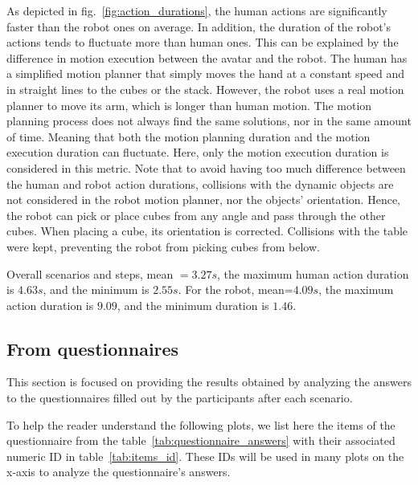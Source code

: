 As depicted in fig.~\ref{fig:action_durations}, the human actions are significantly faster than the robot ones on average. In addition, the duration of the robot's actions tends to fluctuate more than human ones. This can be explained by the difference in motion execution between the avatar and the robot. The human has a simplified motion planner that simply moves the hand at a constant speed and in straight lines to the cubes or the stack. However, the robot uses a real motion planner to move its arm, which is longer than human motion. The motion planning process does not always find the same solutions, nor in the same amount of time. Meaning that both the motion planning duration and the motion execution duration can fluctuate. Here, only the motion execution duration is considered in this metric. Note that to avoid having too much difference between the human and robot action durations, collisions with the dynamic objects are not considered in the robot motion planner, nor the objects' orientation. Hence, the robot can pick or place cubes from any angle and pass through the other cubes. When placing a cube, its orientation is corrected. Collisions with the table were kept, preventing the robot from picking cubes from below.  

Overall scenarios and steps, mean $=3.27s$, the maximum human action duration is $4.63s$, and the minimum is $2.55s$. For the robot, mean=$4.09s$, the maximum action duration is $9.09$, and the minimum duration is $1.46$.

\subsection{From questionnaires}

This section is focused on providing the results obtained by analyzing the answers to the questionnaires filled out by the participants after each scenario.

To help the reader understand the following plots, we list here the items of the questionnaire from the table~\ref{tab:questionnaire_answers} with their associated numeric ID in table~\ref{tab:items_id}. These IDs will be used in many plots on the x-axis to analyze the questionnaire's answers.

